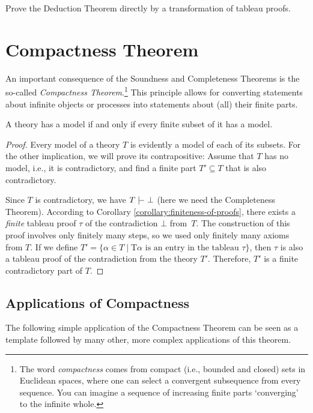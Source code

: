 \begin{exercise}
Prove the Deduction Theorem directly by a transformation of tableau proofs.
\end{exercise}

\section{Compactness Theorem}

An important consequence of the Soundness and Completeness Theorems is the so-called \emph{Compactness Theorem}.\footnote{The word \emph{compactness} comes from compact (i.e., bounded and closed) sets in Euclidean spaces, where one can select a convergent subsequence from every sequence. You can imagine a sequence of increasing finite parts `converging' to the infinite whole.} This principle allows for converting statements about infinite objects or processes into statements about (all) their finite parts.

\begin{theorem}\label{theorem:compactness-theorem}
A theory has a model if and only if every finite subset of it has a model.    
\end{theorem}

\begin{proof}
Every model of a theory $T$ is evidently a model of each of its subsets. For the other implication, we will prove its contrapositive: Assume that $T$ has no model, i.e., it is contradictory, and find a finite part $T' \subseteq T$ that is also contradictory.

Since $T$ is contradictory, we have $T \proves \bot$ (here we need the Completeness Theorem). According to Corollary \ref{corollary:finiteness-of-proofs}, there exists a \emph{finite} tableau proof $\tau$ of the contradiction $\bot$ from~$T$. The construction of this proof involves only finitely many steps, so we used only finitely many axioms from $T$. If we define $T' = \{\alpha \in T \mid \mathrm{T}\alpha \text{ is an entry in the tableau $\tau$}\}$, then $\tau$ is also a tableau proof of the contradiction from the theory $T'$. Therefore, $T'$ is a finite contradictory part of $T$.
\end{proof}

\subsection{Applications of Compactness}

The following simple application of the Compactness Theorem can be seen as a template followed by many other, more complex applications of this theorem. 

